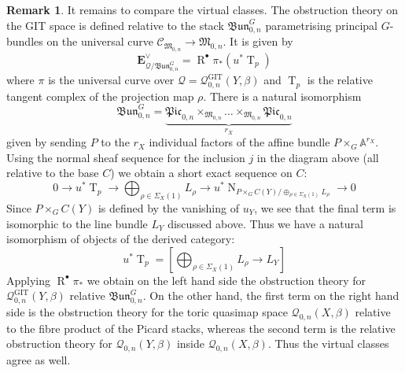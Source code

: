 \documentclass[11pt]{amsart}
\newcommand{\TT}{\operatorname{T}}
\renewcommand{\to}{\rightarrow}
\newcommand{\EE}{\mathbf{E}}
\newcommand{\MM}{\mathfrak M}
\newcommand{\R}{\operatorname{R}^{\bullet}}
\newcommand{\om}[1]{\mathcal{#1}}
\newcommand{\NN}{\operatorname{N}}
\theoremstyle{definition}
\theoremstyle{definition}
\newtheorem{remark}[thm]{Remark}
\begin{document}
\begin{remark}
It remains to compare the virtual classes. The obstruction theory on the GIT space is defined relative to the stack $\mathfrak{Bun}^{G}_{0,n}$ parametrising principal $G$-bundles on the universal curve
$\mathcal{C}_{\MM_{0,n}} \to \MM_{0,n}$.
It is given by
\begin{equation*} \EE_{\om{Q}/\mathfrak{Bun}^G_{0,n}}^\vee = \R \pi_* (u^*\TT_p) \end{equation*}
where $\pi$ is the universal curve over $\om{Q} = \om{Q}^{\operatorname{GIT}}_{0,n}(Y,\beta)$ and $\TT_p$ is the relative tangent complex of the projection map $\rho$. There is a natural isomorphism
\begin{equation*} \mathfrak{Bun}^{G}_{0,n} = \underbrace{\mathfrak{Pic}_{0,n} \times_{\MM_{0,n}} \ldots \times_{\MM_{0,n}} \mathfrak{Pic}_{0,n}}_{r_X} \end{equation*}
given by sending $P$ to the $r_X$ individual factors of the affine bundle $P\times_{G}\mathbb A^{r_X}$. 
Using the normal sheaf sequence for the inclusion $j$ in the diagram above (all relative to the base $C$) we obtain a short exact sequence on $C$:
\begin{equation*} 0 \to u^* \TT_p \to \bigoplus_{\rho \in \Sigma_X(1)} L_\rho \to u^* \NN_{P \times_G C(Y)/\oplus_{\rho \in \Sigma_X(1)} L_\rho} \to 0 \end{equation*}
Since $P \times_G C(Y)$ is defined by the vanishing of $u_Y$, we see that the final term is isomorphic to the line bundle $L_Y$ discussed above. Thus we have a natural isomorphism of objects of the derived category:
\begin{equation*} u^* \TT_p = \left[ \bigoplus_{\rho \in \Sigma_X(1)} L_\rho \to L_Y \right] \end{equation*}
Applying $\R \pi_*$ we obtain on the left hand side the obstruction theory for $\om{Q}^{\operatorname{GIT}}_{0,n}(Y,\beta)$ relative $\mathfrak{Bun}^G_{0,n}$. On the other hand, the first term on the right hand side is the obstruction theory for the toric quasimap space $\om{Q}_{0,n}(X,\beta)$ relative to the fibre product of the Picard stacks, %
whereas the second term is the relative obstruction theory for $\om{Q}_{0,n}(Y,\beta)$ inside $\om{Q}_{0,n}(X,\beta)$. Thus the virtual classes agree as well.

\end{remark}
\end{document}

